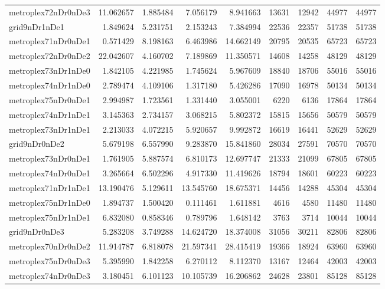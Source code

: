 \begin{longtable}{|l|r|r|r|r|r|r|r|r|}
metroplex72nDr0nDe3 & 11.062657 & 1.885484 & 7.056179 & 8.941663 & 13631 & 12942 & 44977 & 44977 \\
grid9nDr1nDe1 & 1.849624 & 5.231751 & 2.153243 & 7.384994 & 22536 & 22357 & 51738 & 51738 \\
metroplex71nDr0nDe1 & 0.571429 & 8.198163 & 6.463986 & 14.662149 & 20795 & 20535 & 65723 & 65723 \\
metroplex72nDr0nDe2 & 22.042607 & 4.160702 & 7.189869 & 11.350571 & 14608 & 14258 & 48129 & 48129 \\
metroplex73nDr1nDe0 & 1.842105 & 4.221985 & 1.745624 & 5.967609 & 18840 & 18706 & 55016 & 55016 \\
metroplex74nDr1nDe0 & 2.789474 & 4.109106 & 1.317180 & 5.426286 & 17090 & 16978 & 50134 & 50134 \\
metroplex75nDr0nDe1 & 2.994987 & 1.723561 & 1.331440 & 3.055001 & 6220 & 6136 & 17864 & 17864 \\
metroplex74nDr1nDe1 & 3.145363 & 2.734157 & 3.068215 & 5.802372 & 15815 & 15656 & 50579 & 50579 \\
metroplex73nDr1nDe1 & 2.213033 & 4.072215 & 5.920657 & 9.992872 & 16619 & 16441 & 52629 & 52629 \\
grid9nDr0nDe2 & 5.679198 & 6.557990 & 9.283870 & 15.841860 & 28034 & 27591 & 70570 & 70570 \\
metroplex73nDr0nDe1 & 1.761905 & 5.887574 & 6.810173 & 12.697747 & 21333 & 21099 & 67805 & 67805 \\
metroplex74nDr0nDe1 & 3.265664 & 6.502296 & 4.917330 & 11.419626 & 18794 & 18601 & 60223 & 60223 \\
metroplex71nDr1nDe1 & 13.190476 & 5.129611 & 13.545760 & 18.675371 & 14456 & 14288 & 45304 & 45304 \\
metroplex75nDr1nDe0 & 1.894737 & 1.500420 & 0.111461 & 1.611881 & 4616 & 4580 & 11480 & 11480 \\
metroplex75nDr1nDe1 & 6.832080 & 0.858346 & 0.789796 & 1.648142 & 3763 & 3714 & 10044 & 10044 \\
grid9nDr0nDe3 & 5.283208 & 3.749288 & 14.624720 & 18.374008 & 31056 & 30211 & 82806 & 82806 \\
metroplex70nDr0nDe2 & 11.914787 & 6.818078 & 21.597341 & 28.415419 & 19366 & 18924 & 63960 & 63960 \\
metroplex75nDr0nDe3 & 5.395990 & 1.842258 & 6.270112 & 8.112370 & 13167 & 12464 & 42003 & 42003 \\
metroplex74nDr0nDe3 & 3.180451 & 6.101123 & 10.105739 & 16.206862 & 24628 & 23801 & 85128 & 85128 \\

\end{longtable}
